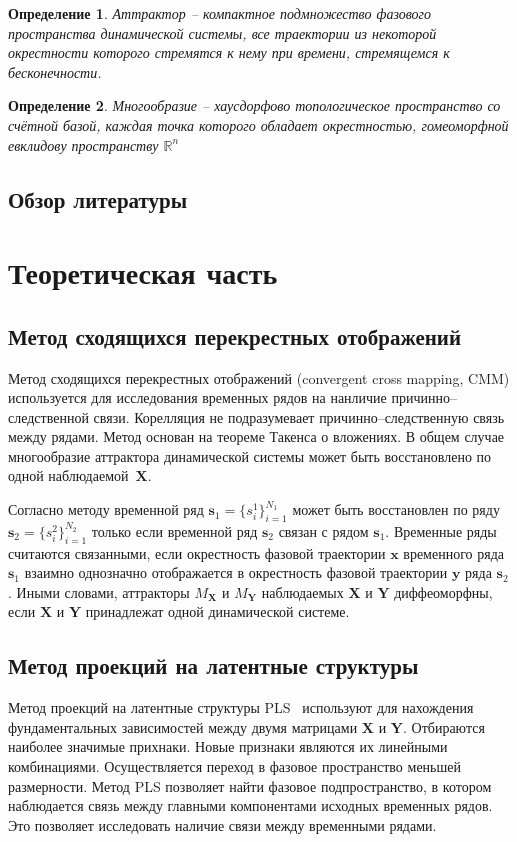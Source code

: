 \documentclass[12pt]{extarticle}
\newtheorem{definition}{Определение}
\newcommand{\bbr}{\mathbb{R}}
\begin{document}
\begin{definition}
Аттрактор -- компактное подмножество фазового пространства динамической системы, все траектории из некоторой окрестности которого стремятся к нему при времени, стремящемся к бесконечности. 
\end{definition}

\begin{definition}
Многообразие -- хаусдорфово топологическое пространство со счётной базой, каждая точка которого обладает окрестностью, гомеоморфной евклидову пространству $\bbr^n$
\end{definition}


\newpage

\subsection{Обзор литературы}




\section{Теоретическая часть}


\subsection{Метод сходящихся перекрестных отображений}
Метод сходящихся перекрестных отображений (convergent cross mapping, CMM) используется для исследования временных рядов на нанличие причинно--следственной связи. Корелляция не подразумевает причинно--следственную связь между рядами. Метод основан на теореме Такенса о вложениях. В общем случае многообразие аттрактора динамической системы может быть восстановлено по одной наблюдаемой~$\mathbf{X}$.

Согласно методу временной ряд $\mathbf{s}_1 = \{s_i^1 \}_{i=1}^{N_1}$ может быть восстановлен по ряду $\mathbf{s}_2 = \{s_i^2 \}_{i=1}^{N_2}$ только если временной ряд $\mathbf{s}_2$ связан с рядом $\mathbf{s}_1$. Временные ряды считаются связанными, если окрестность фазовой траектории $\mathbf{x}$ временного ряда $\mathbf{s}_1$ взаимно однозначно отображается в окрестность фазовой траектории $\mathbf{y}$ ряда $\mathbf{s}_2$. Иными словами, аттракторы $M_{\mathbf{X}}$ и $M_{\mathbf{Y}}$ наблюдаемых $\mathbf{X}$ и $\mathbf{Y}$ диффеоморфны, если $\mathbf{X}$ и $\mathbf{Y}$ принадлежат одной динамической системе.

\subsection{Метод проекций на латентные структуры}
Метод проекций на латентные структуры PLS~\cite{geladi1988notes, hoskuldsson1988pls} используют для нахождения фундаментальных зависимостей между двумя матрицами $\mathbf{X}$ и $\mathbf{Y}$. Отбираются наиболее значимые прихнаки. Новые признаки являются их линейными комбинациями. Осуществляется переход в фазовое пространство меньшей размерности. Метод PLS позволяет найти фазовое подпространство, в котором наблюдается связь между главными компонентами исходных временных рядов. Это позволяет исследовать наличие связи между временными рядами. 
\end{document}
